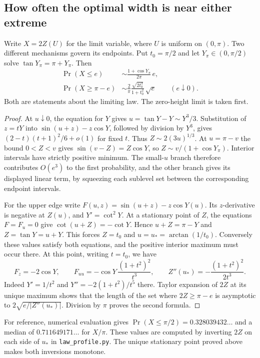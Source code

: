\documentclass[11pt,letterpaper]{article}
\theoremstyle{remark}\newtheorem{remark}[theorem]{Remark}
\begin{document}
\subsection*{How often the optimal width is near either extreme}
Write $X=2Z(U)$ for the limit variable, where $U$ is uniform on $(0,\pi)$.
Two different mechanisms govern its endpoints. Put $t_0=\pi/2$ and
let $Y_\pi\in(0,\pi/2)$ solve $\tan Y_\pi=\pi+Y_\pi$. Then
\begin{equation}\label{eq:edges}
\begin{aligned}
 \Pr(X\le e)&\sim \frac{1+\cos Y_\pi}{2\pi}\,e,\\[2pt]
 \Pr(X\ge\pi-e)&\sim
 \frac{2}{\pi}\frac{\sqrt{2t_0^3}}{1+t_0^2}\,\sqrt{e}
 \qquad(e\downarrow0).
\end{aligned}
\end{equation}
Both are statements about the limiting law. The zero-height limit is
taken first.

\begin{proof}
At $u\downarrow0$, the equation for $Y$ gives
$u=\tan Y-Y\sim Y^3/3$. Substitution of $z=tY$ into
$\sin(u+z)-z\cos Y$, followed by division by $Y^3$, gives
$(2-t)(t+1)^2/6+o(1)$ for fixed $t$. Thus $Z\sim 2(3u)^{1/3}$.
At $u=\pi-v$ the bound $0<Z<v$ gives
$\sin(v-Z)=Z\cos Y$, so $Z\sim v/(1+\cos Y_\pi)$.
Interior intervals have strictly positive minimum. The small-$u$ branch
therefore contributes $O(e^3)$ to the first probability, and the other
branch gives its displayed linear term, by squeezing each sublevel set
between the corresponding endpoint intervals.

For the upper edge write $F(u,z)=\sin(u+z)-z\cos Y(u)$.
Its $z$-derivative is negative at $Z(u)$, and $Y'=\cot^2Y$.
At a stationary point of $Z$, the equations $F=F_u=0$ give
$\cot(u+Z)=-\cot Y$. Hence $u+Z=\pi-Y$ and $Z=\tan Y=u+Y$.
This forces $Z=t_0$ and $u=u_*=\arctan(1/t_0)$.
Conversely these values satisfy both equations, and the positive interior
maximum must occur there. At this point, writing $t=t_0$, we have
\[
 F_z=-2\cos Y,\qquad F_{uu}=-\cos Y\,\frac{(1+t^2)^2}{t^3},
 \qquad Z''(u_*)=-\frac{(1+t^2)^2}{2t^3}.
\]
Indeed $Y'=1/t^2$ and $Y''=-2(1+t^2)/t^5$ there. Taylor expansion
of $2Z$ at its unique maximum shows that the length of the set where
$2Z\ge\pi-e$ is asymptotic to $2\sqrt{e/|Z''(u_*)|}$.
Division by $\pi$ proves the second formula.
\end{proof}
For reference, numerical evaluation gives $\Pr(X\le\pi/2)=0.328039432\ldots$
and a median of $0.711649171\ldots$ for $X/\pi$. These values are computed
by inverting $2Z$ on each side of $u_*$ in \texttt{law\_profile.py}.
The unique stationary point proved above makes both inversions monotone.
\end{document}
